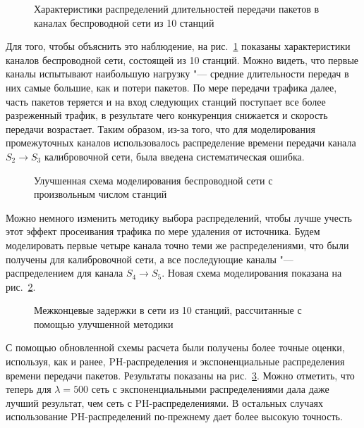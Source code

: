 \begin{figure}[h]
  \caption{Характеристики распределений длительностей передачи пакетов в каналах беспроводной сети из 10 станций}
  \label{fig:ch4_ns3_net_10_props}
\end{figure}

Для того, чтобы объяснить это наблюдение, на рис.~\ref{fig:ch4_ns3_net_10_props} показаны характеристики каналов беспроводной сети, состоящей из 10 станций. Можно видеть, что первые каналы испытывают наибольшую нагрузку "--- средние длительности передач в них самые большие, как и потери пакетов. По мере передачи трафика далее, часть пакетов теряется и на вход следующих станций поступает все более разреженный трафик, в результате чего конкуренция снижается и скорость передачи возрастает. Таким образом, из-за того, что для моделирования промежуточных каналов использовалось распределение времени передачи канала $S_2 \rightarrow S_3$ калибровочной сети, была введена систематическая ошибка.

\begin{figure}[h]
  \caption{Улучшенная схема моделирования беспроводной сети с произвольным числом станций}
  \label{fig:ch4_network_model_schema_refined}
\end{figure}

Можно немного изменить методику выбора распределений, чтобы лучше учесть этот эффект просеивания трафика по мере удаления от источника. Будем моделировать первые четыре канала точно теми же распределениями, что были получены для калибровочной сети, а все последующие каналы "--- распределением для канала $S_4 \rightarrow S_5$. Новая схема моделирования показана на рис.~\ref{fig:ch4_network_model_schema_refined}.

\begin{figure}[h]
  \caption{Межконцевые задержки в сети из 10 станций, рассчитанные с помощью улучшенной методики}
  \label{fig:ch4_ns3_tandem_delays_refined}
\end{figure}

С помощью обновленной схемы расчета были получены более точные оценки, используя, как и ранее, PH-распределения и экспоненциальные распределения времени передачи пакетов. Результаты показаны на рис.~\ref{fig:ch4_ns3_tandem_delays_refined}. Можно отметить, что теперь для $\lambda = 500$ сеть с экспоненциальными распределениями дала даже лучший результат, чем сеть с PH-распределениями. В остальных случаях использование PH-распределений по-прежнему дает более высокую точность.

